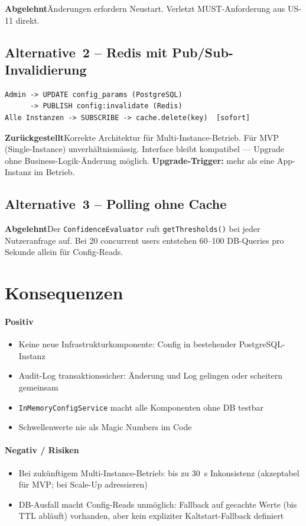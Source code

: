 \documentclass[a4paper, 11pt, oneside]{report}
\newcommand{\code}[1]{\texttt{\small #1}}
\newcommand{\abgelehnt}{\colorbox{depbg}{\small\bfseries\color{warnframe}Abgelehnt}\;}
\newcommand{\zurueckgestellt}{\colorbox{notebg}{\small\bfseries\color{noteframe}Zur\"{u}ckgestellt}\;}
\begin{document}
\abgelehnt Änderungen erfordern Neustart. Verletzt MUST-Anforderung
aus US-11 direkt.

\subsection{Alternative~2 -- Redis mit Pub/Sub-Invalidierung}

\begin{lstlisting}[style=diagram]
Admin -> UPDATE config_params (PostgreSQL)
      -> PUBLISH config:invalidate (Redis)
Alle Instanzen -> SUBSCRIBE -> cache.delete(key)  [sofort]
\end{lstlisting}

\zurueckgestellt Korrekte Architektur für Multi-Instance-Betrieb.
Für MVP (Single-Instance) unverhältnismässig. Interface bleibt kompatibel ---
Upgrade ohne Business-Logik-Änderung möglich.
\textbf{Upgrade-Trigger:} mehr als eine App-Instanz im Betrieb.

\subsection{Alternative~3 -- Polling ohne Cache}

\abgelehnt Der \code{ConfidenceEvaluator} ruft \code{getThresholds()} bei
jeder Nutzeranfrage auf. Bei 20 concurrent users entstehen 60--100 DB-Queries
pro Sekunde allein für Config-Reads.

\section{Konsequenzen}

\paragraph{Positiv}
\begin{itemize}
  \item Keine neue Infrastrukturkomponente: Config in bestehender PostgreSQL-Instanz
  \item Audit-Log transaktionssicher: Änderung und Log gelingen oder scheitern gemeinsam
  \item \code{InMemoryConfigService} macht alle Komponenten ohne DB testbar
  \item Schwellenwerte nie als Magic Numbers im Code
\end{itemize}

\paragraph{Negativ / Risiken}
\begin{itemize}
  \item Bei zukünftigem Multi-Instance-Betrieb: bis zu 30~s Inkonsistenz
        (akzeptabel für MVP; bei Scale-Up adressieren)
  \item DB-Ausfall macht Config-Reads unmöglich: Fallback auf gecachte Werte
        (bis TTL abläuft) vorhanden, aber kein expliziter Kaltstart-Fallback
        definiert
\end{itemize}
\end{document}
